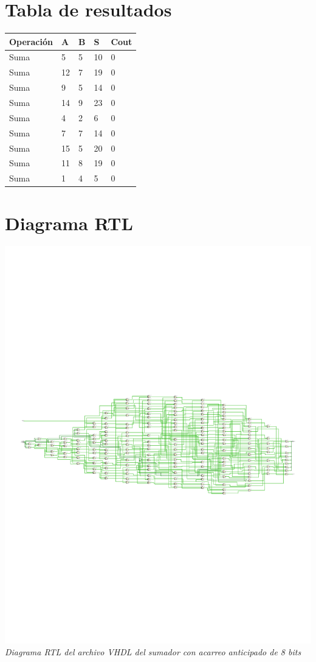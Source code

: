 \documentclass[12pt,executivepaper]{article}
\begin{document}
\section{Tabla de resultados}
\begin{center}
    \begin{tabular}{|p{2cm}|p{2cm}|p{2cm}|p{3cm}|p{2cm}|}
    \hline
    Operación & A & B & S & Cout \\\hline
    Suma & 5 & 5 & 10 & 0\\\hline
    Suma & 12 & 7 & 19 & 0 \\\hline
    Suma & 9 & 5 & 14 & 0 \\\hline
    Suma & 14 & 9 & 23 & 0 \\\hline
    Suma & 4 & 2 & 6 & 0 \\\hline
    Suma & 7 & 7 & 14 & 0 \\\hline
    Suma & 15 & 5 & 20 & 0 \\\hline
    Suma & 11 & 8 & 19 & 0 \\\hline
    Suma & 1 & 4 & 5 & 0 \\\hline
    \end{tabular}
\end{center}
\clearpage
\section{Diagrama RTL}
\begin{center}
    \includegraphics[scale=0.7]{sources/rtlDiagram.pdf}
    \textit{Diagrama RTL del archivo VHDL del sumador con acarreo anticipado de 8 bits}
\end{center}
\end{document}
